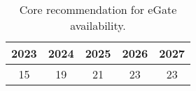 \begin{table}[ht]
\centering
\begin{tabular}{ccccc}
  \hline
{\textbf{2023}} & {\textbf{2024}} & {\textbf{2025}} & {\textbf{2026}} & {\textbf{2027}} \\ 
  \hline
 15 &  19 &  21 &  23 &  23 \\ 
   \hline
\end{tabular}
\caption{Core recommendation for eGate availability. \label{tab:core_recommendation}} 
\end{table}
